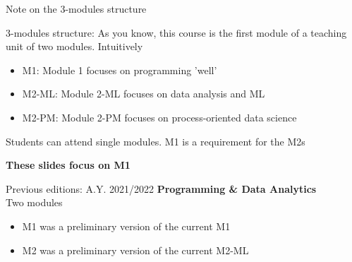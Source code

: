 \documentclass{beamer}%
\begin{document}
\begin{frame}{Note on the 3-modules structure}
	\begin{block}{3-modules structure: %
		}
		As you know, this course is the first module of a teaching unit of two modules. Intuitively
		\begin{itemize}
			\item M1: Module 1 focuses on programming 'well'
			\item M2-ML: Module 2-ML focuses  on data analysis and ML
			\item M2-PM: Module 2-PM focuses on process-oriented data science
		\end{itemize}
		Students can attend single modules. M1 is a requirement for the M2s
		\vspace{-0.4cm}
		\begin{center}\textbf{These slides focus on M1}\end{center}
	\end{block}	
	\begin{block}{Previous editions: A.Y. 2021/2022}
		\textbf{Programming \& Data Analytics}\\ Two modules
		\begin{itemize}
			\item M1 was a preliminary version of the current M1
			\item M2 was a preliminary version of the current M2-ML
		\end{itemize}
	\end{block}
\end{frame}
%
\end{document}
